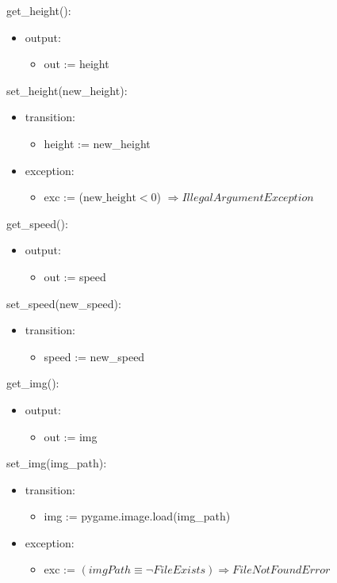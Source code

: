 \documentclass[12pt]{article}
\begin{document}
\noindent get\_height():
\begin{itemize}
    \item output: 
    \begin{itemize}[]
        \item out := height
    \end{itemize}
\end{itemize}


\noindent set\_height(new\_height):
\begin{itemize}
    \item transition: 
    \begin{itemize}[]
        \item height := new\_height
    \end{itemize}

    \item exception:
        \begin{itemize}[]
            \item exc := ($\text{new\_height} < 0$) $\Rightarrow  IllegalArgumentException$
        \end{itemize}
\end{itemize}


\noindent get\_speed():
\begin{itemize}
    \item output: 
    \begin{itemize}[]
        \item out := speed
    \end{itemize}
\end{itemize}


\noindent set\_speed(new\_speed):
\begin{itemize}
    \item transition: 
    \begin{itemize}[]
        \item speed := new\_speed
    \end{itemize}

\end{itemize}


\noindent get\_img():
\begin{itemize}
    \item output: 
    \begin{itemize}[]
        \item out := img 
    \end{itemize}
\end{itemize}


\noindent set\_img(img\_path):
\begin{itemize}
    \item transition: 
    \begin{itemize}[]
        \item img := pygame.image.load(img\_path)
    \end{itemize}
    \item exception: 
    \begin{itemize}[]
        \item exc := $(imgPath \equiv \neg FileExists) \Rightarrow FileNotFoundError $
    \end{itemize}
\end{itemize}
\end{document}
